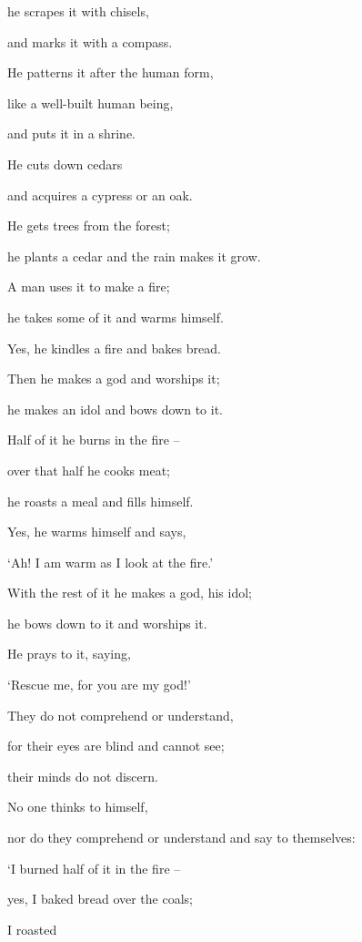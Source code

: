 {\par }{\Q he scrapes
it with chisels,
\par }{\Q and marks
it with a compass.
\par }{\Q He patterns
it after the human
form,
\par }{\Q like a well-built
human
being,
\par }{\Q and puts
it in a shrine.
\par }{\Q {}He cuts down
cedars
\par }{\Q and acquires
a cypress
or an oak.
\par }{\Q He gets
trees
from the forest;
\par }{\Q he plants
a cedar
and the rain
makes it grow.
\par }{\Q {}A man
uses it to make a fire;
\par }{\Q he takes
some of it and warms
himself.
\par }{\Q Yes,
he kindles
a fire and bakes
bread.
\par }{\Q Then he makes
a god
and worships
it;
\par }{\Q he makes
an idol
and bows down to it.
\par }{\Q {}Half
of it he burns
in
the fire
–
\par }{\Q over
that half
he cooks
meat;
\par }{\Q he roasts
a meal
and fills
himself.
\par }{\Q Yes,
he warms
himself and says,
\par }{\Q ‘Ah! I am warm
as I look at
the fire.’
\par }{\Q {}With the rest
of it he makes a
god,
his idol;
\par }{\Q he bows down to it and worships
it.
\par }{\Q He prays
to
it, saying,
\par }{\Q ‘Rescue
me, for
you
are my god!’
\par }{\Q {}They do not
comprehend
or
understand,
\par }{\Q for
their eyes
are blind
and cannot see;
\par }{\Q their minds
do not discern.
\par }{\Q {}No
one thinks
to
himself,
\par }{\Q nor
do they comprehend
or
understand
and say
to themselves:
\par }{\Q ‘I burned
half
of it in
the fire
–
\par }{\Q yes,
I baked
bread
over
the coals;
\par }{\Q I roasted
}
